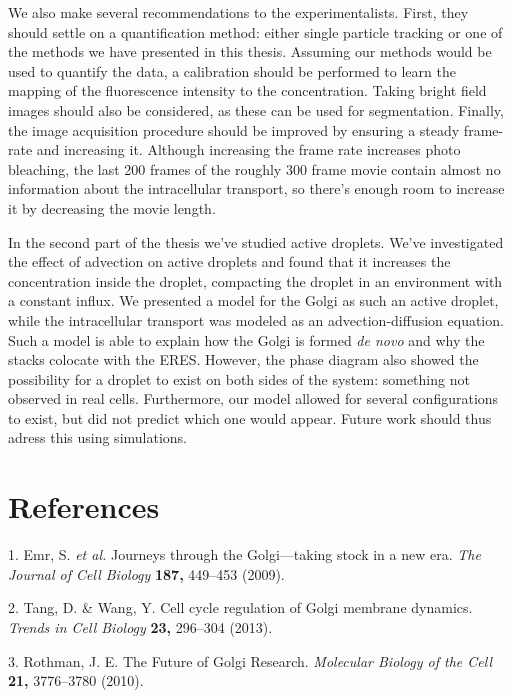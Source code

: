 \documentclass{Dissertate}
\begin{document}
We also make several recommendations to the experimentalists. First,
they should settle on a quantification method: either single particle
tracking or one of the methods we have presented in this thesis.
Assuming our methods would be used to quantify the data, a calibration
should be performed to learn the mapping of the fluorescence intensity
to the concentration. Taking bright field images should also be
considered, as these can be used for segmentation. Finally, the image
acquisition procedure should be improved by ensuring a steady frame-rate
and increasing it. Although increasing the frame rate increases photo
bleaching, the last 200 frames of the roughly 300 frame movie contain
almost no information about the intracellular transport, so there's
enough room to increase it by decreasing the movie length.

In the second part of the thesis we've studied active droplets. We've
investigated the effect of advection on active droplets and found that
it increases the concentration inside the droplet, compacting the
droplet in an environment with a constant influx. We presented a model
for the Golgi as such an active droplet, while the intracellular
transport was modeled as an advection-diffusion equation. Such a model
is able to explain how the Golgi is formed \emph{de novo} and why the
stacks colocate with the ERES. However, the phase diagram also showed
the possibility for a droplet to exist on both sides of the system:
something not observed in real cells. Furthermore, our model allowed for
several configurations to exist, but did not predict which one would
appear. Future work should thus adress this using simulations.

\footnotesize

\hypertarget{references}{%
\chapter*{References}\label{references}}

\hypertarget{refs}{}
\leavevmode\hypertarget{ref-emr_journeys_2009}{}%
1. Emr, S. \emph{et al.} Journeys through the Golgi---taking stock in a
new era. \emph{The Journal of Cell Biology} \textbf{187,} 449--453
(2009).

\leavevmode\hypertarget{ref-tang_cell_2013}{}%
2. Tang, D. \& Wang, Y. Cell cycle regulation of Golgi membrane
dynamics. \emph{Trends in Cell Biology} \textbf{23,} 296--304 (2013).

\leavevmode\hypertarget{ref-rothman_future_2010}{}%
3. Rothman, J. E. The Future of Golgi Research. \emph{Molecular Biology
of the Cell} \textbf{21,} 3776--3780 (2010).
\end{document}
